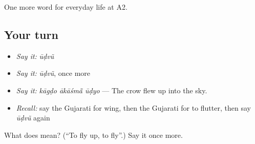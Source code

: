 \begin{grammarlens}[title={What you've built}]
One more word for everyday life at A2.
\end{grammarlens}

\subsection*{Your turn}
\begin{itemize}
\raggedright
  \item \emph{Say it:} \emph{ūḍvũ}
  \item \emph{Say it:} \emph{ūḍvũ}, once more
  \item \emph{Say it:} \emph{kāgḍo ākāśmā̃ ūḍyo} — The crow flew up into the sky.
  \item \emph{Recall:} say the Gujarati for wing, then the Gujarati for to flutter, then say \emph{ūḍvũ} again
\end{itemize}

\begin{tcolorbox}[breakable,colback=teal!4,colframe=teal!35!black,title={Before you move on}]
What does  mean? (\textquotedblleft{}To fly up, to fly\textquotedblright{}.) Say it once more.
\end{tcolorbox}
